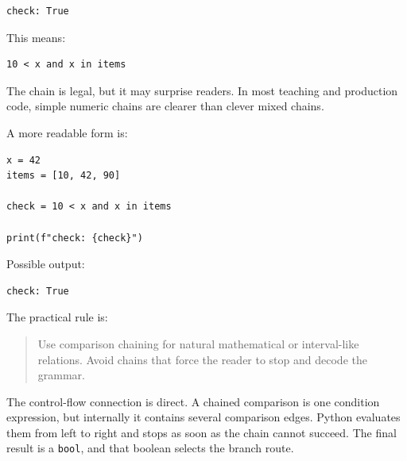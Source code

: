 \begin{verbatim}
check: True
\end{verbatim}

This means:

\begin{verbatim}
10 < x and x in items
\end{verbatim}

The chain is legal, but it may surprise readers. In most teaching and production code, simple numeric chains are clearer than clever mixed chains.

A more readable form is:

\begin{verbatim}
x = 42
items = [10, 42, 90]

check = 10 < x and x in items

print(f"check: {check}")
\end{verbatim}

Possible output:

\begin{verbatim}
check: True
\end{verbatim}

The practical rule is:

\begin{quote}
Use comparison chaining for natural mathematical or interval-like relations. Avoid chains that force the reader to stop and decode the grammar.
\end{quote}

The control-flow connection is direct. A chained comparison is one condition expression, but internally it contains several comparison edges. Python evaluates them from left to right and stops as soon as the chain cannot succeed. The final result is a \texttt{bool}, and that boolean selects the branch route.